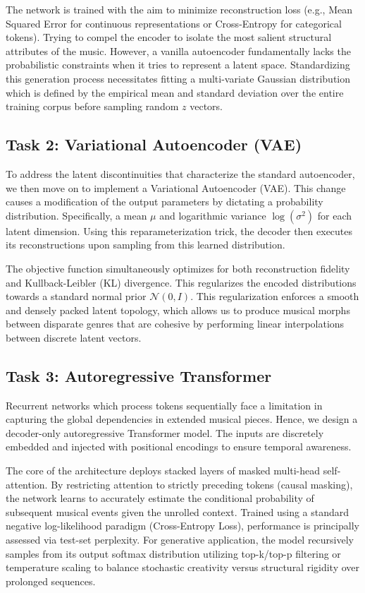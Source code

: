 \documentclass[conference]{IEEEtran}
\begin{document}
The network is trained with the aim to minimize reconstruction loss (e.g., Mean Squared Error for continuous representations or Cross-Entropy for categorical tokens). Trying to compel the encoder to isolate the most salient structural attributes of the music. However, a vanilla autoencoder fundamentally lacks the probabilistic constraints when it tries to represent a latent space. Standardizing this generation process necessitates fitting a multi-variate Gaussian distribution which is defined by the empirical mean and standard deviation over the entire training corpus before sampling random $z$ vectors. 

\subsection{Task 2: Variational Autoencoder (VAE)}
To address the latent discontinuities that characterize the standard autoencoder, we then move on to implement a Variational Autoencoder (VAE). This change causes a modification of the output parameters by dictating a probability distribution. Specifically, a mean $\mu$ and logarithmic variance $\log(\sigma^2)$ for each latent dimension. Using this reparameterization trick, the decoder then executes its reconstructions upon sampling from this learned distribution.

The objective function simultaneously optimizes for both reconstruction fidelity and Kullback-Leibler (KL) divergence. This regularizes the encoded distributions towards a standard normal prior $\mathcal{N}(0, I)$. This regularization enforces a smooth and densely packed latent topology, which allows us to produce musical morphs between disparate genres that are cohesive by performing linear interpolations between discrete latent vectors.

\subsection{Task 3: Autoregressive Transformer}
Recurrent networks which process tokens sequentially face a limitation in capturing the global dependencies in extended musical pieces. Hence, we design a decoder-only autoregressive Transformer model. The inputs are discretely embedded and injected with positional encodings to ensure temporal awareness. 

The core of the architecture deploys stacked layers of masked multi-head self-attention. By restricting attention to strictly preceding tokens (causal masking), the network learns to accurately estimate the conditional probability of subsequent musical events given the unrolled context. Trained using a standard negative log-likelihood paradigm (Cross-Entropy Loss), performance is principally assessed via test-set perplexity. For generative application, the model recursively samples from its output softmax distribution utilizing top-k/top-p filtering or temperature scaling to balance stochastic creativity versus structural rigidity over prolonged sequences.
\end{document}
